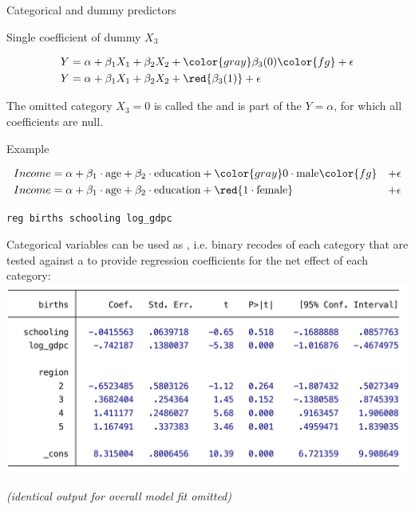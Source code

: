 \documentclass[t]{beamer}
\begin{document}
		\begin{frame}[t]{Categorical and dummy predictors}

			\begin{block}{Single coefficient of dummy $X_3$}

				\vspace{-1em}
				\begin{align*}
					Y &= \alpha + \beta_1 X_1 + \beta_2 X_2 + \color{gray} \beta_3 (0) \color{fg} + \epsilon \\
					Y &= \alpha + \beta_1 X_1 + \beta_2 X_2 + \red{\beta_3 (1)} + \epsilon
				\end{align*}

				The omitted category $X_3 = 0$ is called the  and is part of the  $Y = \alpha$, for which all coefficients are null.
				
			\end{block}
			
			\begin{exampleblock}{Example}

				\vspace{-1em}
				\begin{align*}			
					Income &= \alpha + \beta_1 \cdot \text{age} + \beta_2 \cdot \text{education} + \color{gray} 0 \cdot \text{male} \color{fg} & + \epsilon \\
					Income &= \alpha + \beta_1 \cdot \text{age} + \beta_2 \cdot \text{education} + \red{1 \cdot \text{female}} & + \epsilon
				\end{align*}

			\end{exampleblock}
			
		\end{frame}
					
	\begin{frame}[t]{\texttt{reg births schooling log\_gdpc }}

		Categorical variables can be used as , i.e. binary recodes of each category that are tested against a  to provide regression coefficients for the net effect of each category:\\[.5em]

		\includegraphics[scale=.45]{mreg-output-dummies.pdf}

		\footnotesize{\textit{(identical output for overall model fit omitted)}}

	\end{frame}
\end{document}
